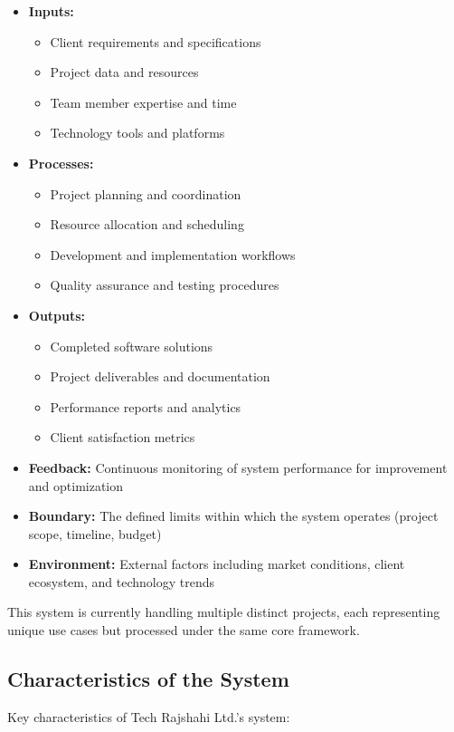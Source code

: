 \documentclass[12pt,a4paper]{article}
\begin{document}
\begin{itemize}
    \item \textbf{Inputs:} 
    \begin{itemize}
        \item Client requirements and specifications
        \item Project data and resources
        \item Team member expertise and time
        \item Technology tools and platforms
    \end{itemize}
    
    \item \textbf{Processes:} 
    \begin{itemize}
        \item Project planning and coordination
        \item Resource allocation and scheduling
        \item Development and implementation workflows
        \item Quality assurance and testing procedures
    \end{itemize}
    
    \item \textbf{Outputs:} 
    \begin{itemize}
        \item Completed software solutions
        \item Project deliverables and documentation
        \item Performance reports and analytics
        \item Client satisfaction metrics
    \end{itemize}
    
    \item \textbf{Feedback:} Continuous monitoring of system performance for improvement and optimization
    \item \textbf{Boundary:} The defined limits within which the system operates (project scope, timeline, budget)
    \item \textbf{Environment:} External factors including market conditions, client ecosystem, and technology trends
\end{itemize}

This system is currently handling multiple distinct projects, each representing unique use cases but processed under the same core framework.

\subsection{Characteristics of the System}
Key characteristics of Tech Rajshahi Ltd.'s system:
\end{document}
